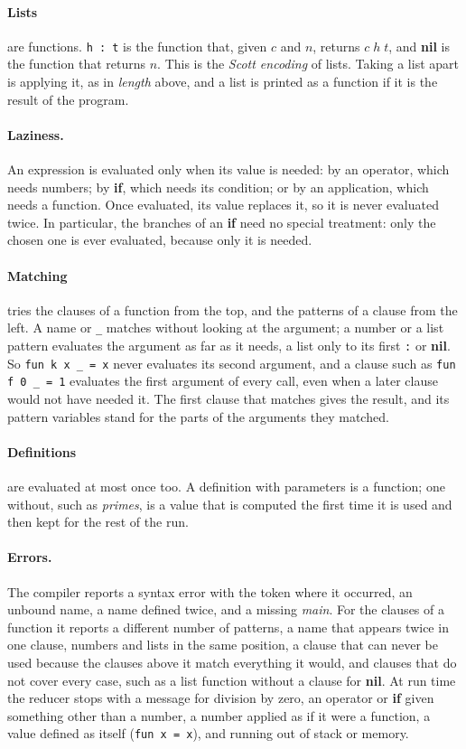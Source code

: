 \documentclass[11pt,a4paper]{article}
\theoremstyle{definition}
\theoremstyle{plain}
\newcommand{\kw}[1]{\textbf{#1}}
\begin{document}
\paragraph{Lists} are functions. \verb|h : t| is the function that, given $c$
and $n$, returns $c\;h\;t$, and \kw{nil} is the function that returns $n$.
This is the \emph{Scott encoding} of lists. Taking a list apart is applying
it, as in \textit{length} above, and a list is printed as a function if it is
the result of the program.

\paragraph{Laziness.} An expression is evaluated only when its value is
needed: by an operator, which needs numbers; by \kw{if}, which needs its
condition; or by an application, which needs a function. Once evaluated, its
value replaces it, so it is never evaluated twice. In particular, the
branches of an \kw{if} need no special treatment: only the chosen one is ever
evaluated, because only it is needed.

\paragraph{Matching} tries the clauses of a function from the top, and the
patterns of a clause from the left. A name or \verb|_| matches without
looking at the argument; a number or a list pattern evaluates the argument
as far as it needs, a list only to its first \verb|:| or \kw{nil}. So
\verb|fun k x _ = x| never evaluates its second argument, and a clause such
as \verb|fun f 0 _ = 1| evaluates the first argument of every call, even
when a later clause would not have needed it. The first clause that matches
gives the result, and its pattern variables stand for the parts of the
arguments they matched.

\paragraph{Definitions} are evaluated at most once too. A definition with
parameters is a function; one without, such as \textit{primes}, is a value
that is computed the first time it is used and then kept for the rest of the
run.

\paragraph{Errors.} The compiler reports a syntax error with the token where
it occurred, an unbound name, a name defined twice, and a missing
\textit{main}. For the clauses of a function it reports a different number
of patterns, a name that appears twice in one clause, numbers and lists in
the same position, a clause that can never be used because the clauses
above it match everything it would, and clauses that do not cover every
case, such as a list function without a clause for \kw{nil}. At run time the reducer stops with a message for division by
zero, an operator or \kw{if} given something other than a number, a number
applied as if it were a function, a value defined as itself
(\verb|fun x = x|), and running out of stack or memory.
\end{document}
